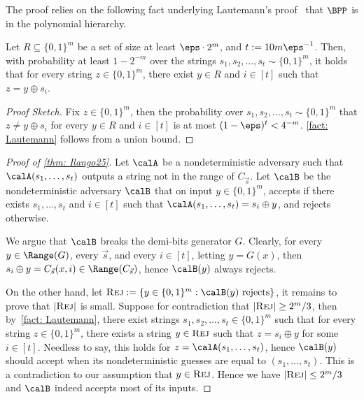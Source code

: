\documentclass[11pt]{article}
\begin{document}
The proof relies on the following fact underlying Lautemann's proof~\cite{Lautemann83} that $\BPP$ is in the polynomial hierarchy.
\begin{fact}\label{fact: Lautemann}
    Let $R\subseteq \{0, 1\}^m$ be a set of size at least $\eps \cdot 2^m$, and $t := 10m\eps^{-1}$. Then, with probability at least $1-2^{-m}$ over the strings $s_1, s_2, \dots, s_t \sim \{0, 1\}^m$, it holds that for every string $z\in\{0, 1\}^m$, there exist $y\in R$ and $i\in[t]$ such that $z = y \oplus s_i$.
\end{fact}
\begin{proof}[Proof Sketch]
    Fix $z\in \{0, 1\}^m$, then the probability over $s_1, s_2, \dots, s_t\sim\{0, 1\}^m$ that $z\ne y\oplus s_i$ for every $y\in R$ and $i\in [t]$ is at most $(1-\eps)^t < 4^{-m}$. \autoref{fact: Lautemann} follows from a union bound.
\end{proof}

\def\Rej{\textsc{Rej}}
\begin{proof}[Proof of \autoref{thm: Ilango25}]
    Let $\calA$ be a nondeterministic adversary such that $\calA(s_1, \dots, s_t)$ outputs a string not in the range of $C_{\vec{s}}$. Let $\calB$ be the nondeterministic adversary $\calB$ that on input $y \in \{0, 1\}^m$, accepts if there exists $s_1, \dots, s_t$ and $i\in [t]$ such that $\calA(s_1, \dots, s_t) = s_i \oplus y$, and rejects otherwise. 
    
    We argue that $\calB$ breaks the demi-bits generator $G$. Clearly, for every $y\in \Range(G)$, every $\vec{s}$, and every $i\in[t]$, letting $y = G(x)$, then $s_i\oplus y = C_{\vec{s}}(x, i) \in \Range(C_{\vec{s}})$, hence $\calB(y)$ always rejects.

    On the other hand, let $\Rej := \{y \in \{0, 1\}^m: \calB(y)\text{ rejects}\}$, it remains to prove that $|\Rej|$ is small. Suppose for contradiction that $|\Rej| \ge 2^m / 3$, then by~\autoref{fact: Lautemann}, there exist strings $s_1, s_2, \dots, s_t \in \{0, 1\}^m$ such that for every string $z \in \{0, 1\}^m$, there exists a string $y \in \Rej$ such that $z = s_i\oplus y$ for some $i\in [t]$. Needless to say, this holds for $z = \calA(s_1, \dots, s_t)$, hence $\calB(y)$ should accept when its nondeterministic guesses are equal to $(s_1, \dots, s_t)$. This is a contradiction to our assumption that $y \in \Rej$. Hence we have $|\Rej| \le 2^m/3$ and $\calB$ indeed accepts most of its inputs.
\end{proof}







\end{document}
